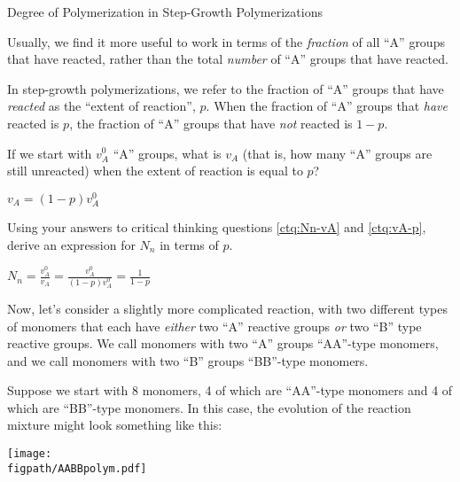 \begin{activity}{Degree of Polymerization in Step-Growth Polymerizations}
\begin{ctqs}
\end{ctqs}
	
\begin{infobox}

Usually, we find it more useful to work in terms of the \emph{fraction} of all ``A'' groups that have reacted, rather than the total \emph{number} of ``A'' groups that have reacted.

In step-growth polymerizations, we refer to the fraction of ``A'' groups that have \emph{reacted} as the ``extent of reaction'', $p$.
When the fraction of ``A'' groups that \emph{have} reacted is $p$, the fraction of ``A'' groups that have \emph{not} reacted is $1-p$.

\end{infobox}
	
\begin{ctqs}
		
		\question \label{ctq:vA-p} If we start with $v_A^0$ ``A'' groups, what is $v_A$ (that is, how many ``A'' groups are still unreacted) when the extent of reaction is equal to $p$?
		
		\begin{solution}[1in]
			$v_A = (1-p)v_A^0$
		\end{solution}
		
		\question Using your answers to critical thinking questions \ref{ctq:Nn-vA} and \ref{ctq:vA-p}, derive an expression for $N_n$ in terms of $p$.
		
		\begin{solution}[1in]
			$N_n = \frac{v_A^0}{v_A} = \frac{v_A^0}{(1-p)v_A^0} = \frac{1}{1-p}$
		\end{solution}
		
\end{ctqs}

\clearpage
\begin{model}

Now, let's consider a slightly more complicated reaction, with two different types of monomers that each have \emph{either} two ``A'' reactive groups \emph{or} two ``B'' type reactive groups.
We call monomers with two ``A'' groups ``AA''-type monomers, and we call monomers with two ``B'' groups ``BB''-type monomers.

Suppose we start with 8 monomers, 4 of which are ``AA''-type monomers and 4 of which are ``BB''-type monomers.
In this case, the evolution of the reaction mixture might look something like this:

\vspace{0.1in}
\centerline{\texttt{[image: \\figpath/AABBpolym.pdf]}}


\end{model}
\end{activity}
